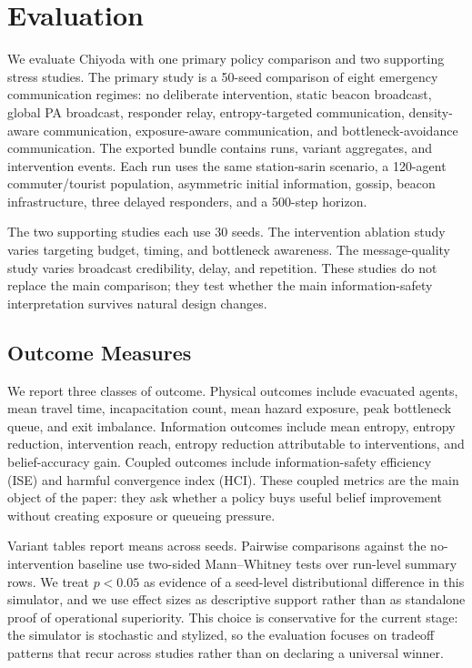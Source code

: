 \section{Evaluation}
\label{sec:evaluation}



We evaluate Chiyoda with one primary policy comparison and two supporting
stress studies. The primary study is a 50-seed comparison of eight emergency
communication regimes: no deliberate intervention, static beacon broadcast,
global PA broadcast, responder relay, entropy-targeted communication,
density-aware communication, exposure-aware communication, and
bottleneck-avoidance communication. The exported bundle contains
\statRunCount{} runs, \statVariantCount{} variant aggregates, and
\statInterventionEvents{} intervention events. Each run uses the same
station-sarin scenario, a 120-agent commuter/tourist population, asymmetric
initial information, gossip, beacon infrastructure, three delayed responders,
and a 500-step horizon.

The two supporting studies each use 30 seeds. The intervention ablation study
varies targeting budget, timing, and bottleneck awareness. The message-quality
study varies broadcast credibility, delay, and repetition. These studies do
not replace the main comparison; they test whether the main
information-safety interpretation survives natural design changes.

\subsection{Outcome Measures}
\label{subsec:outcomes}

We report three classes of outcome. Physical outcomes include evacuated agents,
mean travel time, incapacitation count, mean hazard exposure, peak bottleneck
queue, and exit imbalance. Information outcomes include mean entropy, entropy
reduction, intervention reach, entropy reduction attributable to interventions,
and belief-accuracy gain. Coupled outcomes include information-safety
efficiency (ISE) and harmful convergence index (HCI). These coupled metrics are
the main object of the paper: they ask whether a policy buys useful belief
improvement without creating exposure or queueing pressure.

Variant tables report means across seeds. Pairwise comparisons against the
no-intervention baseline use two-sided Mann--Whitney tests over run-level
summary rows. We treat $p<0.05$ as evidence of a seed-level distributional
difference in this simulator, and we use effect sizes as descriptive support
rather than as standalone proof of operational superiority. This choice is
conservative for the current stage: the simulator is stochastic and stylized,
so the evaluation focuses on tradeoff patterns that recur across studies
rather than on declaring a universal winner.


